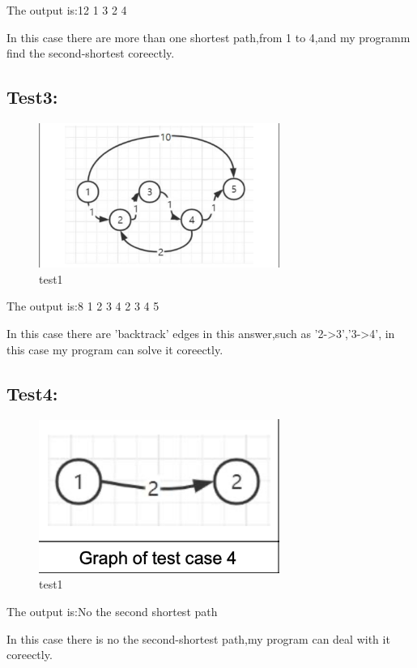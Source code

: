 \documentclass[12pt]{article}
\begin{document}
The output is:12 1 3 2 4

In this case there are more than one shortest path,from 1 to 4,and my programm find the second-shortest coreectly.

\subsection*{Test3:}
\begin{figure}[H]
	\centering
	\includegraphics[width=0.7\textwidth]{4.png}
	\caption{\label{pr}test1}
	\end{figure}
The output is:8 1 2 3 4 2 3 4 5

In this case there are 'backtrack' edges in this answer,such as '2->3','3->4', in this case my program can solve it coreectly.

\subsection*{Test4:}
\begin{figure}[H]
	\centering
	\includegraphics[width=0.7\textwidth]{5.png}
	\caption{\label{pr}test1}
	\end{figure}

The output is:No the second shortest path

In this case there is no the second-shortest path,my program can deal with it coreectly.
\end{document}
